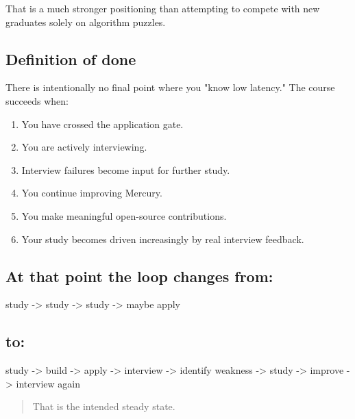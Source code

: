 \documentclass[11pt,letterpaper]{article}
\begin{document}
That is a much stronger positioning than attempting to compete with new graduates solely on algorithm puzzles.

\par{}
\begin{samepage}
\section{Definition of done}\label{sec:22}

There is intentionally no final point where you "know low latency." The course succeeds when:

\begin{enumerate}

\item You have crossed the application gate.

\item You are actively interviewing.

\item Interview failures become input for further study.

\item You continue improving Mercury.

\item You make meaningful open-source contributions.

\item Your study becomes driven increasingly by real interview feedback.

\end{enumerate}

\end{samepage}

\subsection*{At that point the loop changes from:}

{\ttfamily\raggedright study -> study -> study -> maybe apply\par}

\subsection*{to:}

{\ttfamily\raggedright study -> build -> apply -> interview -> identify weakness -> study -> improve -> interview again\par}

\begin{quote}
That is the intended steady state.
\end{quote}
\end{document}
